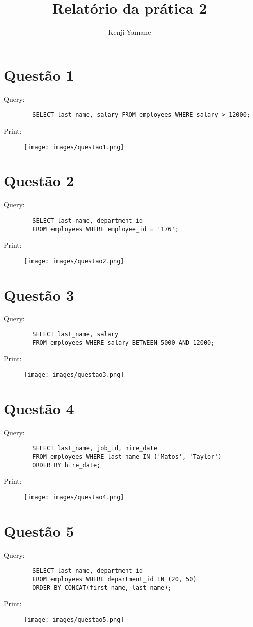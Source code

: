 \documentclass{article}[twocolumn]
\title{Relat\'orio da pr\'atica 2}
\author{Kenji Yamane}
\begin{document}
	\maketitle
	\section{Quest\~ao 1}
	Query:
	\begin{verbatim}
		SELECT last_name, salary FROM employees WHERE salary > 12000;
	\end{verbatim}
	Print:
	\begin{figure}[H]
		\centering
		\texttt{[image: images/questao1.png]}
	\end{figure}
	\newpage
	\section{Quest\~ao 2}
	Query:
	\begin{verbatim}
		SELECT last_name, department_id
		FROM employees WHERE employee_id = '176';
	\end{verbatim}
	Print:
	\begin{figure}[H]
		\centering
		\texttt{[image: images/questao2.png]}
	\end{figure}
	\newpage
	\section{Quest\~ao 3}
	Query:
	\begin{verbatim}
		SELECT last_name, salary
		FROM employees WHERE salary BETWEEN 5000 AND 12000;
	\end{verbatim}
	Print:
	\begin{figure}[H]
		\centering
		\texttt{[image: images/questao3.png]}
	\end{figure}
	\newpage
	\section{Quest\~ao 4}
	Query:
	\begin{verbatim}
		SELECT last_name, job_id, hire_date
		FROM employees WHERE last_name IN ('Matos', 'Taylor')
		ORDER BY hire_date;
	\end{verbatim}
	Print:
	\begin{figure}[H]
		\centering
		\texttt{[image: images/questao4.png]}
	\end{figure}
	\newpage
	\section{Quest\~ao 5}
	Query:
	\begin{verbatim}
		SELECT last_name, department_id
		FROM employees WHERE department_id IN (20, 50)
		ORDER BY CONCAT(first_name, last_name);
	\end{verbatim}
	Print:
	\begin{figure}[H]
		\centering
		\texttt{[image: images/questao5.png]}
	\end{figure}
	\newpage
\end{document}
